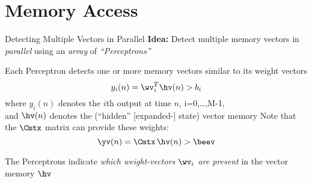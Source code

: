 \section[\sectopts,toc={Processing}]{Memory Access}

\begin{slide}[\slideopts,toc={Perceptrons}]{Detecting Multiple Vectors in Parallel}
\maybepause
\vspace{1em}
\textbf{Idea:} Detect multiple memory vectors in \emph{parallel} using an \emph{array} of \emph{``Perceptrons''}
\begin{itemize}
  \mpitem Each Perceptron detects one or more memory vectors similar to its weight vectors
  \[
  y_i(n) = \wv_i^T\hv(n) > b_i
  \]
  where $y_i(n)$ denotes the $i$th output at time $n$, i=0,\ldots,M-1,\\
  and $\hv(n)$ denotes the (``hidden'' [expanded-] state) vector memory
  \mpitem Note that the $\Cmtx$ matrix can provide these weights:
  \[
  \yv(n) = \Cmtx\,\hv(n) > \beev
  \]

\mpitem The Perceptrons indicate \emph{which weight-vectors $\wv_i$ are present} in the vector memory $\hv$

\end{itemize}

\end{slide}


